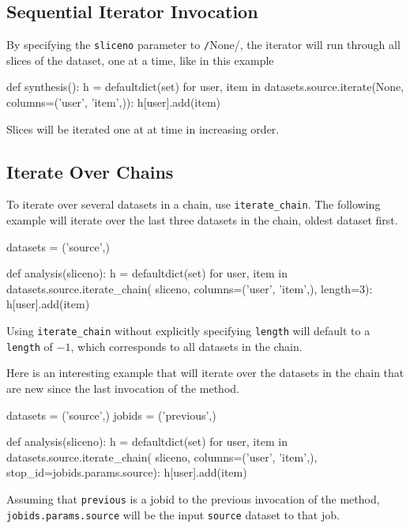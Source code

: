 \subsection*{Sequential Iterator Invocation}
By specifying the \texttt{sliceno} parameter to
\texttt/None/, the iterator will run through all slices of
the dataset, one at a time, like in this example
\begin{python}
def synthesis():
    h = defaultdict(set)
    for user, item in datasets.source.iterate(None,
                                              columns=('user', 'item',)):
        h[user].add(item)
\end{python}
Slices will be iterated one at at time in increasing order.



\subsection*{Iterate Over Chains}
To iterate over several datasets in a chain, use
\texttt{iterate\_chain}.  The following example will iterate over the
last three datasets in the chain, oldest dataset first.
\begin{python}
datasets = ('source',)

def analysis(sliceno):
    h = defaultdict(set)
    for user, item in datasets.source.iterate_chain(
                      sliceno, columns=('user', 'item',), length=3):
        h[user].add(item)
\end{python}
Using \texttt{iterate\_chain} without explicitly specifying
\texttt{length} will default to a \texttt{length} of $-1$, which
corresponds to all datasets in the chain.

Here is an interesting example that will iterate over the datasets in
the chain that are new since the last invocation of the method.
\begin{python}
datasets = ('source',)
jobids = ('previous',)

def analysis(sliceno):
    h = defaultdict(set)
    for user, item in datasets.source.iterate_chain(
            sliceno,
            columns=('user', 'item',),
            stop_id=jobids.params.source):
        h[user].add(item)
\end{python}
Assuming that \texttt{previous} is a jobid to the previous invocation
of the method, \texttt{jobids.params.source} will be the
input \texttt{source} dataset to that job.




